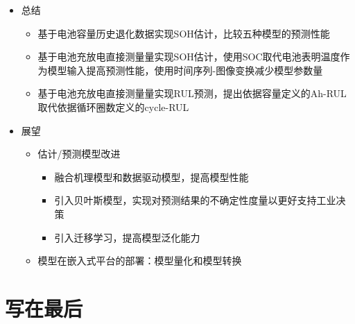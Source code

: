 \documentclass{beamer}
\begin{document}
\begin{frame}
	\begin{itemize}
		\item 总结
			\begin{itemize}
				\item 基于电池容量历史退化数据实现SOH估计，比较五种模型的预测性能
				\item 基于电池充放电直接测量量实现SOH估计，使用SOC取代电池表明温度作为模型输入提高预测性能，使用时间序列-图像变换减少模型参数量
				\item 基于电池充放电直接测量量实现RUL预测，提出依据容量定义的Ah-RUL取代依据循环圈数定义的cycle-RUL
			\end{itemize}
		\item 展望
			\begin{itemize}
				\item 估计/预测模型改进
					\begin{itemize}
						\item 融合机理模型和数据驱动模型，提高模型性能
						\item 引入贝叶斯模型，实现对预测结果的不确定性度量以更好支持工业决策
						\item 引入迁移学习，提高模型泛化能力
					\end{itemize}
				\item 模型在嵌入式平台的部署：模型量化和模型转换
			\end{itemize}
	\end{itemize}
\end{frame}

\section{写在最后}
\end{document}
